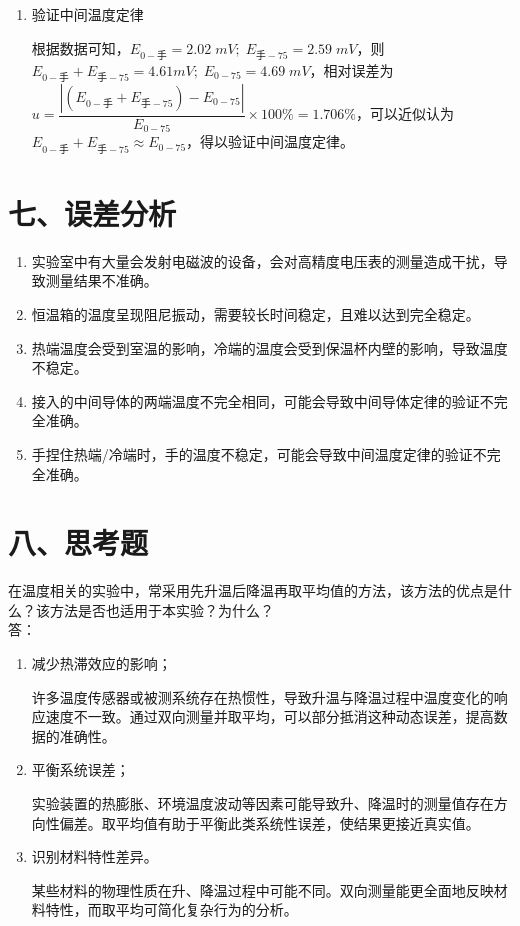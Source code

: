 \documentclass[11pt]{article}
\begin{document}
\begin{enumerate}
    \item 验证中间温度定律
    
    根据数据可知，$E_{0-\text{手}}=2.02\;mV;\;E_{\text{手}-75}=2.59\;mV$，则$E_{0-\text{手}}+E_{\text{手}-75}=4.61mV;\;E_{0-75}=4.69\;mV$，相对误差为$u=\dfrac{|(E_{0-\text{手}}+E_{\text{手}-75})-E_{0-75}|}{E_{0-75}}\times100\%=1.706\%$，可以近似认为$E_{0-\text{手}}+E_{\text{手}-75}\approx E_{0-75}$，得以验证中间温度定律。

\end{enumerate}

\section*{七、误差分析}

\begin{enumerate}
    \item 实验室中有大量会发射电磁波的设备，会对高精度电压表的测量造成干扰，导致测量结果不准确。
    \item 恒温箱的温度呈现阻尼振动，需要较长时间稳定，且难以达到完全稳定。
    \item 热端温度会受到室温的影响，冷端的温度会受到保温杯内壁的影响，导致温度不稳定。
    \item 接入的中间导体的两端温度不完全相同，可能会导致中间导体定律的验证不完全准确。
    \item 手捏住热端/冷端时，手的温度不稳定，可能会导致中间温度定律的验证不完全准确。
\end{enumerate}

\section*{八、思考题}

在温度相关的实验中，常采用先升温后降温再取平均值的方法，该方法的优点是什么？该方法是否也适用于本实验？为什么？
\\答：

\begin{enumerate}
    \item 减少热滞效应的影响；
    
    许多温度传感器或被测系统存在热惯性，导致升温与降温过程中温度变化的响应速度不一致。通过双向测量并取平均，可以部分抵消这种动态误差，提高数据的准确性。
    \item 平衡系统误差；
    
    实验装置的热膨胀、环境温度波动等因素可能导致升、降温时的测量值存在方向性偏差。取平均值有助于平衡此类系统性误差，使结果更接近真实值。
    \item 识别材料特性差异。
    
    某些材料的物理性质在升、降温过程中可能不同。双向测量能更全面地反映材料特性，而取平均可简化复杂行为的分析。
\end{enumerate}
\end{document}
